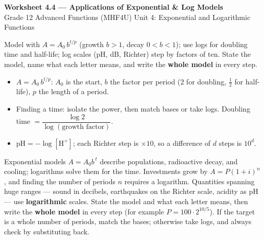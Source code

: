 \documentclass[11pt]{article}
\begin{document}
\begin{center}
{\LARGE\bfseries\color{titleblue}Worksheet 4.4 --- Applications of Exponential \& Log Models}\\[2pt]
{\small Grade 12 Advanced Functions (MHF4U) \textperiodcentered{} Unit 4: Exponential and Logarithmic Functions}
\end{center}

\begin{ideabox}
Model with $A=A_0\,b^{t/p}$ (growth $b>1$, decay $0<b<1$); use logs for doubling time and half-life; log scales (pH, dB, Richter) step by factors of ten. State the model, name what each letter means, and write the \textbf{whole model} in every step.
\begin{itemize}[leftmargin=*,itemsep=2pt]
  \item $A=A_0\,b^{t/p}$: $A_0$ is the start, $b$ the factor per period ($2$ for doubling, $\tfrac12$ for half-life), $p$ the length of a period.
  \item Finding a time: isolate the power, then match bases or take logs. Doubling time $=\dfrac{\log2}{\log(\text{growth factor})}$.
  \item $\text{pH}=-\log[\text{H}^+]$; each Richter step is $\times10$, so a difference of $d$ steps is $10^d$.
\end{itemize}
\end{ideabox}

\begin{learnbox}
Exponential models $A=A_0 b^{\,t}$ describe populations, radioactive decay, and cooling; logarithms solve them for the time.
Investments grow by $A=P(1+i)^n$, and finding the number of periods $n$ requires a logarithm.
Quantities spanning huge ranges — sound in decibels, earthquakes on the Richter scale, acidity as pH — use \textbf{logarithmic} scales.
State the model and what each letter means, then write the \textbf{whole model} in every step (for example $P=100\cdot2^{10/5}$). If the target is a whole number of periods, match the bases; otherwise take logs, and always check by substituting back.
\end{learnbox}

\end{document}
